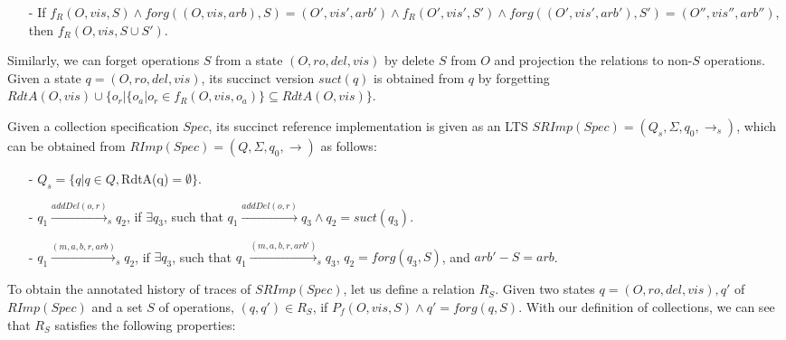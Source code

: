 \begin{itemize}
\begin{itemize}

    \item[-] If $f_R(O,\mathit{vis},S) \wedge forg((O,\mathit{vis},\mathit{arb}),S) = (O',\mathit{vis}',\mathit{arb}') \wedge f_R(O',\mathit{vis}',S') \wedge forg((O',\mathit{vis}',\mathit{arb}'),S') = (O'',\mathit{vis}'',\mathit{arb}'')$, then $f_R(O,\mathit{vis},S \cup S')$.
    \end{itemize}
\end{itemize}

Similarly, we can forget operations $S$ from a state $(O,\mathit{ro},\mathit{del},\mathit{vis})$ by delete $S$ from $O$ and projection the relations to non-$S$ operations. Given a state $q = (O,\mathit{ro},\mathit{del},\mathit{vis})$, its succinct version $suct(q)$ is obtained from $q$ by forgetting $RdtA(O,\mathit{vis}) \cup \{ o_r \vert  \{ o_a \vert o_r \in f_R(O,\mathit{vis},o_a) \} \subseteq RdtA(O,\mathit{vis}) \}$. %

Given a collection specification $Spec$, its succinct reference implementation is given as an LTS $SRImp(Spec) = (Q_s,\Sigma,q_0,\rightarrow_s)$, which can be obtained from $RImp(Spec) = (Q,\Sigma,q_0,\rightarrow)$ as follows: %

\begin{itemize}
\setlength{\itemsep}{0.5pt}
\item[-] $Q_s = \{ q \vert q \in Q, $RdtA(q)$ = \emptyset \}$.

\item[-] $q_1 {\xrightarrow{addDel(o,r)}}_s q_2$, if $\exists q_3$, such that $q_1 {\xrightarrow{addDel(o,r)}} q_3 \wedge q_2 = suct(q_3)$.

\item[-] $q_1 {\xrightarrow{(m,a,b,r,\mathit{arb})}}_s q_2$, if $\exists q_3$, such that $q_1 {\xrightarrow{(m,a,b,r,\mathit{arb}')}}_s q_3$, $q_2 = forg(q_3,S)$, and $\mathit{arb}' - S = \mathit{arb}$.
\end{itemize}

To obtain the annotated history of traces of $SRImp(Spec)$, let us define a relation $R_S$. Given two states $q=(O,\mathit{ro},\mathit{del},\mathit{vis}),q'$ of $RImp(Spec)$ and a set $S$ of operations, $(q,q') \in R_S$, if $P_f(O,\mathit{vis},S) \wedge q' = forg(q,S)$. With our definition of collections, we can see that $R_S$ satisfies the following properties:

